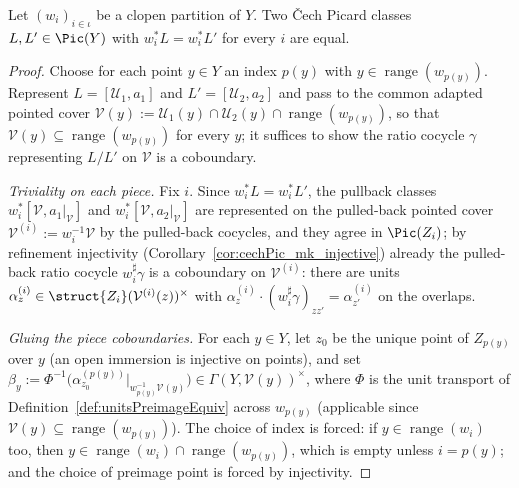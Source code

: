 \begin{theorem}
  \label{thm:cechPic_clopen_separation}
  \leanok
  Let \((w_i)_{i \in \iota}\) be a clopen partition of \(Y\). Two \v Cech Picard classes
  \(L, L' \in \Pic(Y)\) with \(w_i^{*} L = w_i^{*} L'\) for every \(i\) are equal.
\end{theorem}
\begin{proof}
  \leanok
  Choose for each point \(y \in Y\) an index \(p(y)\) with \(y \in \operatorname{range}(w_{p(y)})\).
  Represent \(L = [\mathcal U_1, a_1]\) and \(L' = [\mathcal U_2, a_2]\) and pass to the common
  adapted pointed cover \(\mathcal V(y) := \mathcal U_1(y) \cap \mathcal U_2(y) \cap
  \operatorname{range}(w_{p(y)})\), so that \(\mathcal V(y) \subseteq \operatorname{range}(w_{p(y)})\)
  for every \(y\); it suffices to show the ratio cocycle \(\gamma\) representing \(L/L'\) on
  \(\mathcal V\) is a coboundary.

  \emph{Triviality on each piece.} Fix \(i\). Since \(w_i^{*}L = w_i^{*}L'\), the pullback classes
  \(w_i^{*}[\mathcal V, a_1|_{\mathcal V}]\) and \(w_i^{*}[\mathcal V, a_2|_{\mathcal V}]\) are
  represented on the pulled-back pointed cover \(\mathcal V^{(i)} := w_i^{-1}\mathcal V\) by the
  pulled-back cocycles, and they agree in \(\Pic(Z_i)\); by refinement injectivity
  (Corollary~\ref{cor:cechPic_mk_injective}) already the pulled-back ratio cocycle
  \(w_i^{\sharp}\gamma\) is a coboundary on \(\mathcal V^{(i)}\): there are units
  \(\alpha^{(i)}_z \in \struct{Z_i}(\mathcal V^{(i)}(z))^{\times}\) with
  \(\alpha^{(i)}_z \cdot (w_i^{\sharp}\gamma)_{zz'} = \alpha^{(i)}_{z'}\) on the overlaps.

  \emph{Gluing the piece coboundaries.} For each \(y \in Y\), let \(z_0\) be the unique point of
  \(Z_{p(y)}\) over \(y\) (an open immersion is injective on points), and set
  \(\beta_y := \Phi^{-1}\bigl(\alpha^{(p(y))}_{z_0}|_{w_{p(y)}^{-1}\mathcal V(y)}\bigr) \in
  \Gamma(Y, \mathcal V(y))^{\times}\), where \(\Phi\) is the unit transport of
  Definition~\ref{def:unitsPreimageEquiv} across \(w_{p(y)}\) (applicable since
  \(\mathcal V(y) \subseteq \operatorname{range}(w_{p(y)})\)). The choice of index is forced: if
  \(y \in \operatorname{range}(w_i)\) too, then \(y \in \operatorname{range}(w_i) \cap
  \operatorname{range}(w_{p(y)})\), which is empty unless \(i = p(y)\); and the choice of preimage
  point is forced by injectivity.


\end{proof}
